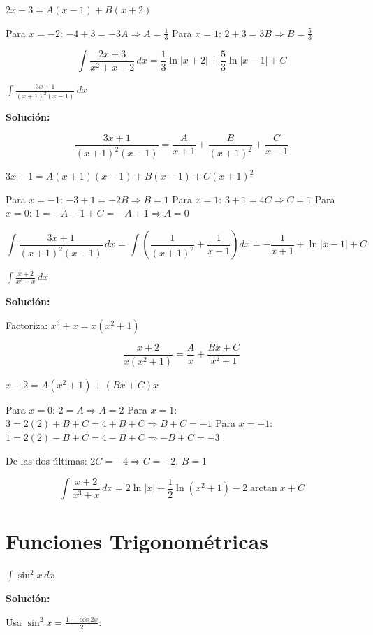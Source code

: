 \documentclass[12pt, a4paper]{book}
\begin{document}
$2x+3 = A(x-1) + B(x+2)$

Para $x = -2$: $-4+3 = -3A \Rightarrow A = \frac{1}{3}$
Para $x = 1$: $2+3 = 3B \Rightarrow B = \frac{5}{3}$

\[
\int \frac{2x+3}{x^2+x-2} \, dx = \frac{1}{3}\ln|x+2| + \frac{5}{3}\ln|x-1| + C
\]

\begin{ejercicio}
$\int \frac{3x+1}{(x+1)^2(x-1)} \, dx$
\end{ejercicio}

\textbf{Solución:}

\[
\frac{3x+1}{(x+1)^2(x-1)} = \frac{A}{x+1} + \frac{B}{(x+1)^2} + \frac{C}{x-1}
\]

$3x+1 = A(x+1)(x-1) + B(x-1) + C(x+1)^2$

Para $x = -1$: $-3+1 = -2B \Rightarrow B = 1$
Para $x = 1$: $3+1 = 4C \Rightarrow C = 1$
Para $x = 0$: $1 = -A - 1 + C = -A + 1 \Rightarrow A = 0$

\[
\int \frac{3x+1}{(x+1)^2(x-1)} \, dx = \int \left(\frac{1}{(x+1)^2} + \frac{1}{x-1}\right) dx = -\frac{1}{x+1} + \ln|x-1| + C
\]

\begin{ejercicio}
$\int \frac{x+2}{x^3+x} \, dx$
\end{ejercicio}

\textbf{Solución:}

Factoriza: $x^3+x = x(x^2+1)$

\[
\frac{x+2}{x(x^2+1)} = \frac{A}{x} + \frac{Bx+C}{x^2+1}
\]

$x+2 = A(x^2+1) + (Bx+C)x$

Para $x = 0$: $2 = A \Rightarrow A = 2$
Para $x = 1$: $3 = 2(2) + B + C = 4 + B + C \Rightarrow B + C = -1$
Para $x = -1$: $1 = 2(2) - B + C = 4 - B + C \Rightarrow -B + C = -3$

De las dos últimas: $2C = -4 \Rightarrow C = -2$, $B = 1$

\[
\int \frac{x+2}{x^3+x} \, dx = 2\ln|x| + \frac{1}{2}\ln(x^2+1) - 2\arctan x + C
\]

\section{Funciones Trigonométricas}

\begin{ejercicio}
$\int \sin^2 x \, dx$
\end{ejercicio}

\textbf{Solución:}

Usa $\sin^2 x = \frac{1-\cos 2x}{2}$:
\end{document}
